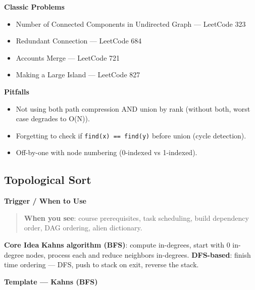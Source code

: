 \documentclass[11pt]{article}
\providecommand{\tightlist}{\setlength{\itemsep}{1pt}\setlength{\parskip}{0pt}}
\begin{document}
\textbf{Classic Problems}

\begin{itemize}
\tightlist
\item
  Number of Connected Components in Undirected Graph --- LeetCode 323
\item
  Redundant Connection --- LeetCode 684
\item
  Accounts Merge --- LeetCode 721
\item
  Making a Large Island --- LeetCode 827
\end{itemize}

\textbf{Pitfalls}

\begin{itemize}
\tightlist
\item
  Not using both path compression AND union by rank (without both, worst case degrades to O(N)).
\item
  Forgetting to check if \texttt{find(x)\ ==\ find(y)} before union (cycle detection).
\item
  Off-by-one with node numbering (0-indexed vs 1-indexed).
\end{itemize}

\subsection{Topological Sort}\label{topological-sort}

\textbf{Trigger / When to Use}

\begin{quote}
\textbf{When you see}: course prerequisites, task scheduling, build dependency order, DAG ordering, alien dictionary.
\end{quote}

\textbf{Core Idea}
\textbf{Kahn\textquotesingle s algorithm (BFS)}: compute in-degrees, start with 0 in-degree nodes, process each and reduce neighbors\textquotesingle{} in-degrees. \textbf{DFS-based}: finish time ordering --- DFS, push to stack on exit, reverse the stack.

\textbf{Template --- Kahn\textquotesingle s (BFS)}

\end{document}
